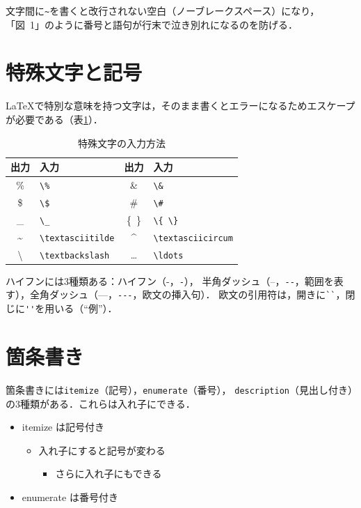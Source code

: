文字間に\verb|~|を書くと改行されない空白（ノーブレークスペース）になり，
「図~1」のように番号と語句が行末で泣き別れになるのを防げる．

\section{特殊文字と記号}
\label{sec:special}
\LaTeX で特別な意味を持つ文字は，そのまま書くとエラーになるためエスケープが必要である（表\ref{tab:special}）．

\begin{table}[htbp]
    \centering
    \caption{特殊文字の入力方法}
    \label{tab:special}
    \begin{tabular}{cl@{\qquad}cl}\toprule
        出力 & 入力 & 出力 & 入力 \\ \midrule
        \% & \verb|\%|  & \&         & \verb|\&| \\
        \$ & \verb|\$|  & \#         & \verb|\#| \\
        \_ & \verb|\_|  & \{\ \}     & \verb|\{ \}| \\
        \textasciitilde & \verb|\textasciitilde| & \textasciicircum & \verb|\textasciicircum| \\
        \textbackslash  & \verb|\textbackslash|  & \ldots           & \verb|\ldots| \\ \bottomrule
    \end{tabular}
\end{table}

ハイフンには3種類ある：ハイフン（-，\verb|-|），
半角ダッシュ（--，\verb|--|，範囲を表す），全角ダッシュ（---，\verb|---|，欧文の挿入句）．
欧文の引用符は，開きに\verb|``|，閉じに\verb|''|を用いる（``例''）．

\section{箇条書き}
\label{sec:lists}
箇条書きには\texttt{itemize}（記号），\texttt{enumerate}（番号），
\texttt{description}（見出し付き）の3種類がある．これらは入れ子にできる．

\begin{itemize}
    \item itemize は記号付き
    \begin{itemize}
        \item 入れ子にすると記号が変わる
        \begin{itemize}
            \item さらに入れ子にもできる
        \end{itemize}
    \end{itemize}
    \item enumerate は番号付き
\end{itemize}

